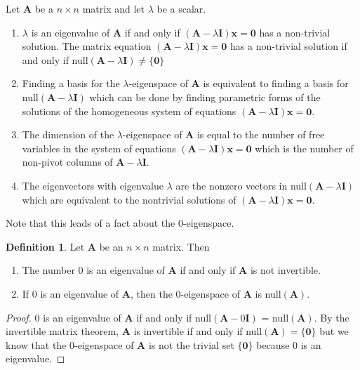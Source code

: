 \documentclass[
]{book}
\theoremstyle{definition}
\newtheorem{definition}{Definition}[chapter]
\theoremstyle{definition}
\theoremstyle{definition}
\theoremstyle{definition}
\theoremstyle{remark}
\begin{document}
Let \(\mathbf{A}\) be a \(n \times n\) matrix and let \(\lambda\) be a scalar.

\begin{enumerate}
\def\labelenumi{\arabic{enumi})}
\item
  \(\lambda\) is an eigenvalue of \(\mathbf{A}\) if and only if \((\mathbf{A} - \lambda \mathbf{I})\mathbf{x} = \mathbf{0}\) has a non-trivial solution. The matrix equation \((\mathbf{A} - \lambda \mathbf{I})\mathbf{x} = \mathbf{0}\) has a non-trivial solution if and only if null\((\mathbf{A} - \lambda \mathbf{I}) \neq \{\mathbf{0} \}\)
\item
  Finding a basis for the \(\lambda\)-eigenspace of \(\mathbf{A}\) is equivalent to finding a basis for null\((\mathbf{A} - \lambda \mathbf{I})\) which can be done by finding parametric forms of the solutions of the homogeneous system of equations \((\mathbf{A} - \lambda \mathbf{I})\mathbf{x} = \mathbf{0}\).
\item
  The dimension of the \(\lambda\)-eigenspace of \(\mathbf{A}\) is equal to the number of free variables in the system of equations \((\mathbf{A} - \lambda \mathbf{I})\mathbf{x} = \mathbf{0}\) which is the number of non-pivot columns of \(\mathbf{A} - \lambda \mathbf{I}\).
\item
  The eigenvectors with eigenvalue \(\lambda\) are the nonzero vectors in null\((\mathbf{A} - \lambda \mathbf{I})\) which are equivalent to the nontrivial solutions of \((\mathbf{A} - \lambda \mathbf{I})\mathbf{x} = \mathbf{0}\).
\end{enumerate}

Note that this leads of a fact about the \(0\)-eigenspace.

\begin{definition}

Let \(\mathbf{A}\) be an \(n \times n\) matrix. Then

\begin{enumerate}
\def\labelenumi{\arabic{enumi})}
\item
  The number 0 is an eigenvalue of \(\mathbf{A}\) if and only if \(\mathbf{A}\) is not invertible.
\item
  If 0 is an eigenvalue of \(\mathbf{A}\), then the 0-eigenspace of \(\mathbf{A}\) is null\((\mathbf{A})\).
\end{enumerate}

\end{definition}

\begin{proof}
0 is an eigenvalue of \(\mathbf{A}\) if and only if null\((\mathbf{A} - 0 \mathbf{I})\) = null\((\mathbf{A})\). By the invertible matrix theorem, \(\mathbf{A}\) is invertible if and only if null\((\mathbf{A}) = \{\mathbf{0}\}\) but we know that the 0-eigenspace of \(\mathbf{A}\) is not the trivial set \(\{\mathbf{0}\}\) because 0 is an eigenvalue.
\end{proof}
\end{document}
